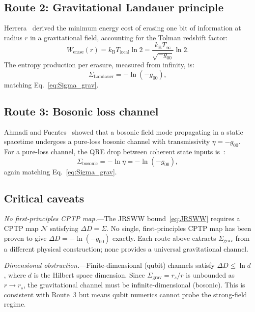 \documentclass[prl,twocolumn,superscriptaddress,longbibliography,floatfix]{revtex4-2}
\newcommand{\kB}{k_{\mathrm{B}}}
\newcommand{\chan}{\mathcal{N}}
\begin{document}
\subsection{Route 2: Gravitational Landauer principle}

Herrera~\cite{Herrera2020} derived the minimum energy cost of
erasing one bit of information at radius $r$ in a gravitational
field, accounting for the Tolman redshift factor:
\begin{equation}
W_{\text{erase}}(r) = \kB T_{\text{local}} \ln 2
= \frac{\kB T_\infty}{\sqrt{-g_{00}}} \ln 2.
\label{eq:landauer_grav}
\end{equation}
The entropy production per erasure, measured from infinity, is:
\begin{equation}
\Sigma_{\text{Landauer}} = -\ln(-g_{00}),
\label{eq:landauer_sigma}
\end{equation}
matching Eq.~\eqref{eq:Sigma_grav}.

\subsection{Route 3: Bosonic loss channel}

Ahmadi and Fuentes~\cite{AhmadiFuentes2014} showed that
a bosonic field mode propagating in a static spacetime
undergoes a pure-loss bosonic channel with transmissivity
$\eta = -g_{00}$. For a pure-loss channel, the QRE drop
between coherent state inputs is~\cite{Wilde2017}:
\begin{equation}
\Sigma_{\text{bosonic}} = -\ln\eta = -\ln(-g_{00}),
\label{eq:bosonic_sigma}
\end{equation}
again matching Eq.~\eqref{eq:Sigma_grav}.

\subsection{Critical caveats}

\emph{No first-principles CPTP map.}---The JRSWW
bound~\eqref{eq:JRSWW} requires a CPTP map $\chan$ satisfying
$\Delta D = \Sigma$. No single, first-principles CPTP map has been
proven to give $\Delta D = -\ln(-g_{00})$ exactly. Each route above
extracts $\Sigma_{\text{grav}}$ from a different physical
construction; none provides a universal gravitational channel.

\emph{Dimensional obstruction.}---Finite-dimensional (qubit)
channels satisfy $\Delta D \leq \ln d$, where $d$ is the Hilbert
space dimension. Since $\Sigma_{\text{grav}} = r_s/r$ is
unbounded as $r \to r_s$, the gravitational channel must be
infinite-dimensional (bosonic). This is consistent with Route~3
but means qubit numerics cannot probe the strong-field regime.
\end{document}
